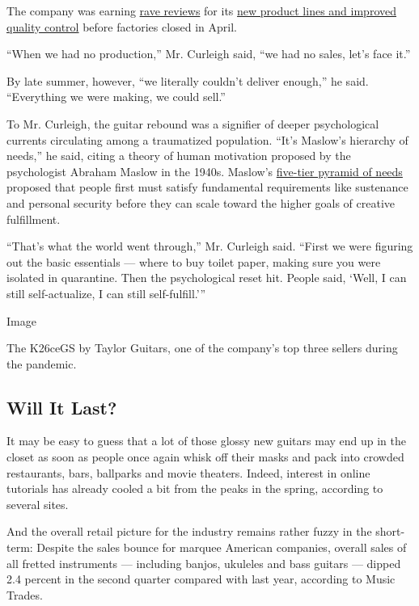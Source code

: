 The company was earning
\href{https://guitarpedaldemos.com/gibson-guitars-quality-control-2019/}{rave
reviews} for its
\href{https://www.forbes.com/sites/stevebaltin/2019/02/26/inside-the-gibson-guitar-comeback-story/\#73871fab2861}{new
product lines and improved quality control} before factories closed in
April.

``When we had no production,'' Mr. Curleigh said, ``we had no sales,
let's face it.''

By late summer, however, ``we literally couldn't deliver enough,'' he
said. ``Everything we were making, we could sell.''

To Mr. Curleigh, the guitar rebound was a signifier of deeper
psychological currents circulating among a traumatized population.
``It's Maslow's hierarchy of needs,'' he said, citing a theory of human
motivation proposed by the psychologist Abraham Maslow in the 1940s.
Maslow's \href{https://www.simplypsychology.org/maslow.html}{five-tier
pyramid of needs} proposed that people first must satisfy fundamental
requirements like sustenance and personal security before they can scale
toward the higher goals of creative fulfillment.

``That's what the world went through,'' Mr. Curleigh said. ``First we
were figuring out the basic essentials --- where to buy toilet paper,
making sure you were isolated in quarantine. Then the psychological
reset hit. People said, `Well, I can still self-actualize, I can still
self-fulfill.'''

Image

The K26ceGS by Taylor Guitars, one of the company's top three sellers
during the pandemic.

\hypertarget{will-it-last}{%
\subsection{Will It Last?}\label{will-it-last}}

It may be easy to guess that a lot of those glossy new guitars may end
up in the closet as soon as people once again whisk off their masks and
pack into crowded restaurants, bars, ballparks and movie theaters.
Indeed, interest in online tutorials has already cooled a bit from the
peaks in the spring, according to several sites.

And the overall retail picture for the industry remains rather fuzzy in
the short-term: Despite the sales bounce for marquee American companies,
overall sales of all fretted instruments --- including banjos, ukuleles
and bass guitars --- dipped 2.4 percent in the second quarter compared
with last year, according to Music Trades.


